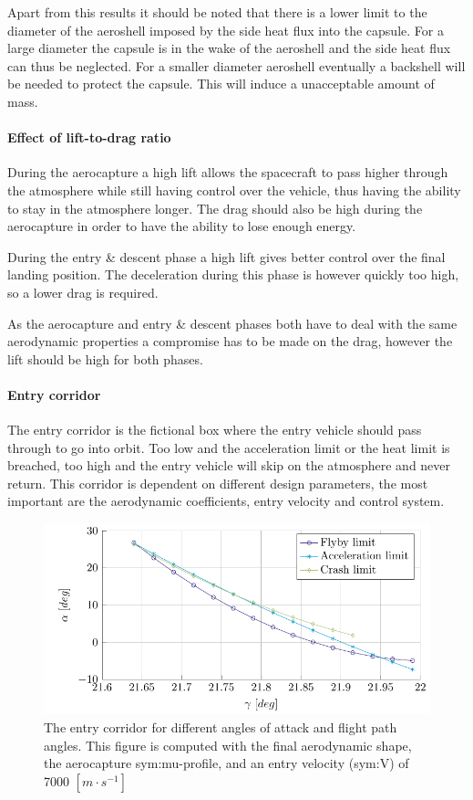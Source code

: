 Apart from this results it should be noted that there is a lower limit to the diameter of the aeroshell imposed by the side heat flux into the capsule. For a large diameter the capsule is in the wake of the aeroshell and the side heat flux can thus be neglected. For a smaller diameter aeroshell eventually a backshell will be needed to protect the capsule. This will induce a unacceptable amount of mass.

\paragraph{Effect of lift-to-drag ratio}
During the aerocapture a high lift allows the spacecraft to pass higher through the atmosphere while still having control over the vehicle, thus having the ability to stay in the atmosphere longer. The drag should also be high during the aerocapture in order to have the ability to lose enough energy.

During the entry \& descent phase a high lift gives better control over the final landing position. The deceleration during this phase is however quickly too high, so a lower drag is required.

As the aerocapture and entry \& descent phases both have to deal with the same aerodynamic properties a compromise has to be made on the drag, however the lift should be high for both phases.

\paragraph{Entry corridor}
The entry corridor is the fictional box where the entry vehicle should pass through to go into orbit. Too low and the acceleration limit or the heat limit is breached, too high and the entry vehicle will skip on the atmosphere and never return. This corridor is dependent on different design parameters, the most important are the aerodynamic coefficients, entry velocity and control system.

\begin{figure}[h]
	\centering
	\includegraphics[width=\textwidth]{./Figure/orbit/alpha_gamma.pdf}
	\caption[The entry corridor for different angles of attack and flight path angles]{The entry corridor for different angles of attack and flight path angles. This figure is computed with the final aerodynamic shape, the aerocapture \gls{sym:mu}-profile, and an entry velocity (\gls{sym:V}) of 7000 $\left[m\cdot s^{-1}\right]$}
	\label{fig:alpha_gamma}
\end{figure}

